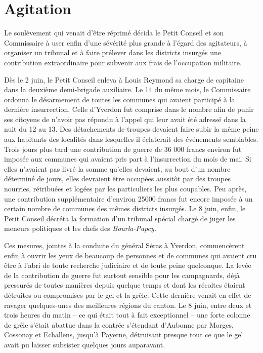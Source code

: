 \documentclass[french,twoside]{book} %
\begin{document}
\section[Agitation]{Agitation}
\noindent Le soulèvement qui venait d’être réprimé décida le Petit Conseil et son Commissaire à user enfin d’une sévérité plus grande à l’égard des agitateurs, à organiser un tribunal et à faire prélever dans les districts insurgés une contribution extraordinaire pour subvenir aux frais de l’occupation militaire.\par
Dès le 2 juin, le Petit Conseil enleva à Louis Reymond sa charge de capitaine dans la deuxième demi-brigade auxiliaire. Le 14 du même mois, le Commissaire ordonna le désarmement de toutes les communes qui avaient participé à la dernière insurrection. Celle d’Yverdon fut comprise dans le nombre afin de punir ses citoyens de n’avoir pas répondu à l’appel qui leur avait été adressé dans la nuit du 12 au 13. Des détachements de troupes devaient faire subir la même peine aux habitants des localités dans lesquelles il éclaterait des événements semblables. Trois jours plus tard une contribution de guerre de 36 000 francs environ fut imposée aux communes qui avaient pris part à l’insurrection du mois de mai. Si elles n’avaient pas livré la somme qu’elles devaient, au bout d’un nombre déterminé de jours, elles devraient être occupées aussitôt par des troupes nourries, rétribuées et logées par les particuliers les plus coupables. Peu après, une contribution supplémentaire d’environ 25000 francs fut encore imposée à un certain nombre de communes des mêmes districts insurgés. Le 8 juin, enfin, le Petit Conseil décréta la formation d’un tribunal spécial chargé de juger les meneurs politiques et les chefs des \emph{Bourla-Papey.}\par
Ces mesures, jointes à la conduite du général Séras à Yverdon, commencèrent enfin à ouvrir les yeux de beaucoup de personnes et de communes qui avaient cru être à l’abri de toute recherche judiciaire et de toute peine quelconque. La levée de la contribution de guerre fut surtout sensible pour les campagnards, déjà pressurés de toutes manières depuis quelque temps et dont les récoltes étaient détruites ou compromises par le gel et la grêle. Cette dernière venait en effet de ravager quelques-unes des meilleures régions du canton. Le 8 juin, entre deux et trois heures du matin – ce qui était tout à fait exceptionnel – une forte colonne de grêle s’était abattue dans la contrée s’étendant d’Aubonne par Morges, Cossonay et Echallens, jusqu’à Payerne, détruisant presque tout ce que le gel avait pu laisser subsister quelques jours auparavant.\par
\end{document}
